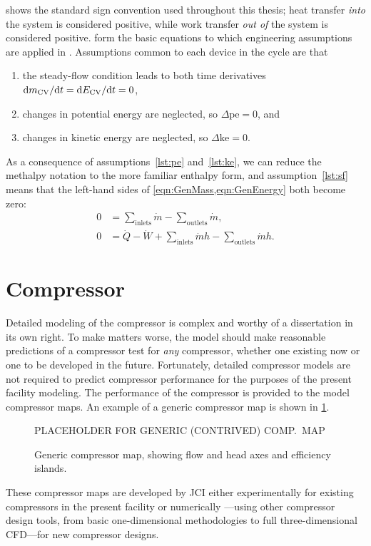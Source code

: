  shows the standard sign convention used throughout this thesis; 
\ie{} heat transfer \emph{into} the system is considered positive, 
while work transfer \emph{out of} the system is considered positive.
 form the basic equations to which 
engineering assumptions are applied in .
Assumptions common to each device in the cycle are that
\begin{enumerate}
  \item the steady-flow condition leads to both time derivatives $\mathop{}\!\mathrm{d}{m_{\text{CV}}}/\!\mathop{}\!\mathrm{d}{t} = \mathop{}\!\mathrm{d}{E_{\text{CV}}}/\!\mathop{}\!\mathrm{d}{t} = 0$, \label{lst:sf}
  \item changes in potential energy are neglected, so $\Delta \text{pe} = 0$, and \label{lst:pe}
  \item changes in kinetic energy are neglected, so $\Delta \text{ke} = 0$. \label{lst:ke}
\end{enumerate}
As a consequence of assumptions~\ref{lst:pe} and~\ref{lst:ke},
we can reduce the methalpy notation to the more familiar enthalpy form,
and assumption~\ref{lst:sf} means that the left-hand sides of \cref{eqn:GenMass,eqn:GenEnergy} both become zero:
\begin{align}
  0 &= \sum_{\text{inlets}}{\dot{m}} - \sum_{\text{outlets}}{\dot{m}}, \label{eqn:SemiMass}\\
  0 &= \dot{Q} - \dot{W} + \sum_{\text{inlets}}{\dot{m}h} - \sum_{\text{outlets}}{\dot{m}h}. \label{eqn:SemiEnergy}
\end{align}

\section{Compressor} \label{sec:Compressor}
Detailed modeling of the compressor is complex and worthy of a dissertation in its own right. 
To make matters worse, the model should make reasonable predictions 
of a compressor test for \emph{any} compressor, 
whether one existing now or one to be developed in the future.
Fortunately, detailed compressor models are not required 
to predict compressor performance for the purposes of the present facility modeling. 
The performance of the compressor is provided to the model \via{} compressor maps. 
An example of a generic compressor map is shown in \cref{fig:GenMap}. 
\begin{figure}[htbp]
  \centering
  PLACEHOLDER FOR GENERIC (CONTRIVED) COMP.~MAP
  \caption{Generic compressor map, showing flow and head axes and efficiency islands.}
  \label{fig:GenMap}
\end{figure}
These compressor maps are developed by JCI either experimentally 
for existing compressors in the present facility or numerically%
---using other compressor design tools, from basic one-dimensional methodologies
to full three-dimensional CFD---for new compressor designs.

